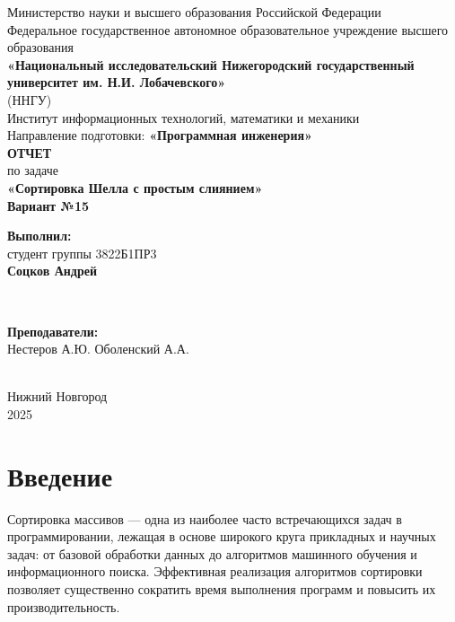 \documentclass[12pt]{article}
\begin{document}
\begin{titlepage}
    \centering
    \large
    Министерство науки и высшего образования Российской Федерации\\[0.5cm]
    Федеральное государственное автономное образовательное учреждение высшего образования\\[0.5cm]
    \textbf{«Национальный исследовательский Нижегородский государственный университет им. Н.И. Лобачевского»}\\
    (ННГУ)\\[1cm]
    Институт информационных технологий, математики и механики\\[0.5cm]
    Направление подготовки: \textbf{«Программная инженерия»}\\[2cm]

    \vfill
    {\LARGE \textbf{ОТЧЕТ}}\\[0.5cm]
    {\Large по задаче}\\[0.5cm]
    {\LARGE \textbf{«Сортировка Шелла с простым слиянием»}}\\[0.5cm]
    {\Large \textbf{Вариант №15}}\\[2.5cm]

    \hfill\parbox{0.5\textwidth}{
        \textbf{Выполнил:} \\
        студент группы 3822Б1ПР3 \\
        \textbf{Соцков Андрей}
    }\\[0.5cm]

    \hfill\parbox{0.5\textwidth}{
        \textbf{Преподаватели:} \\
        Нестеров А.Ю.
        Оболенский А.А.
        
    }\\[2cm]

    Нижний Новгород\\
    2025
\end{titlepage}


\thispagestyle{empty}
\clearpage
{} 
\setcounter{page}{2} 
\tableofcontents
\clearpage
\setcounter{page}{3} 
\section{Введение}

\hspace*{1.25em}Сортировка массивов — одна из наиболее часто встречающихся задач в программировании, лежащая в основе широкого круга прикладных и научных задач: от базовой обработки данных до алгоритмов машинного обучения и информационного поиска. Эффективная реализация алгоритмов сортировки позволяет существенно сократить время выполнения программ и повысить их производительность.
\end{document}
